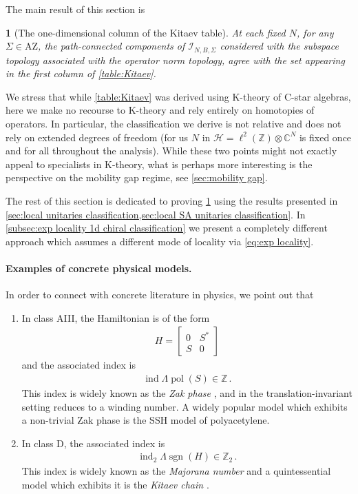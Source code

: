 \documentclass[a4paper,10pt]{article}
\numberwithin{equation}{section}
\theoremstyle{plain}
\newtheorem{thm}{\protect\theoremname}[section]
\theoremstyle{plain}
\theoremstyle{plain}
\theoremstyle{plain}
\theoremstyle{plain}
\theoremstyle{remark}
\theoremstyle{definition}
\theoremstyle{plain}
\providecommand{\theoremname}{Theorem}
\newcommand{\ZZ}{\mathbb{Z}}
\newcommand{\CC}{\mathbb{C}}
\newcommand{\calH}{\mathcal{H}}
\newcommand{\calI}{\mathcal{I}}
\newcommand{\bbLambda}{\mathbb{\Lambda}}
\newcommand{\sgn}{\operatorname{sgn}}
\newcommand{\findex}{\operatorname{ind}}
\newcommand{\eq}[1]{\begin{align*}#1\end{align*}}
\newcommand{\polar}{\operatorname{pol}}
\begin{document}
	The main result of this section is
	\begin{thm}[The one-dimensional column of the Kitaev table]\label{thm:main 1d insulators classification theorem} At each fixed $N$, for any $\Sigma\in\mathrm{AZ}$, the path-connected components of $\calI_{N,B,\Sigma}$ considered with the subspace topology associated with the operator norm topology, agree with the set appearing in the first column of \cref{table:Kitaev}.
	\end{thm}
	We stress that while \cref{table:Kitaev} was derived using K-theory of C-star algebras, here we make no recourse to K-theory and rely entirely on homotopies of operators. In particular, the classification we derive is not relative and does not rely on extended degrees of freedom (for us $N$ in $\calH=\ell^2(\ZZ)\otimes\CC^N$ is fixed once and for all throughout the analysis). While these two points might not exactly appeal to specialists in K-theory, what is perhaps more interesting is the perspective on the mobility gap regime, see \cref{sec:mobility gap}.
	
	The rest of this section is dedicated to proving \cref{thm:main 1d insulators classification theorem} using the results presented in \cref{sec:local unitaries classification,sec:local SA unitaries classification}. In \cref{subsec:exp locality 1d chiral classification} we present a completely different approach which assumes a different mode of locality via \cref{eq:exp locality}.
	
	\paragraph{Examples of concrete physical models.} In order to connect with concrete literature in physics, we point out that
	\begin{enumerate}
		\item In class AIII, the Hamiltonian is of the form \eq{H = \begin{bmatrix}
				0 & S^\ast \\
				S & 0
		\end{bmatrix}} and the associated index is \eq{\findex\bbLambda \polar(S)\in\ZZ\,.} This index is widely known as the \emph{Zak phase} \cite{Zak1989}, and in the translation-invariant setting reduces to a winding number. A widely popular model which exhibits a non-trivial Zak phase is the SSH model \cite{SSH1979} of polyacetylene.
		\item In class D, the associated index is \eq{\findex_2 \bbLambda \sgn(H) \in \ZZ_2\,.} This index is widely known as the \emph{Majorana number} and a quintessential model which exhibits it is the \emph{Kitaev chain} \cite{Kitaev2001}.
	\end{enumerate}
	
\end{document}
